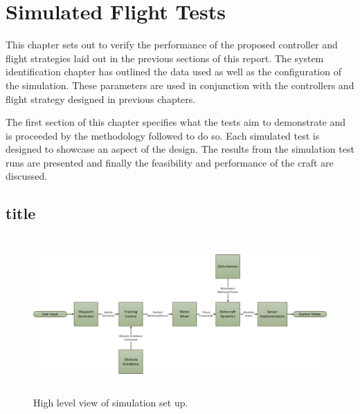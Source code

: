 \chapter{Simulated Flight Tests}
This chapter sets out to verify the performance of the proposed controller and flight strategies laid out in the previous sections of this report. The system identification chapter has outlined the data used as well as the configuration of the simulation. These parameters are used in conjunction with the controllers and flight strategy designed in previous chapters. 

The first section of this chapter specifies what the tests aim to demonstrate and is proceeded by the methodology followed to do so. Each simulated test is designed to showcase an aspect of the design. The results from the simulation test runs are presented and finally the feasibility and performance of the craft are discussed.
	
	\section{title}
	\begin{figure}[H]
		\centering
		\includegraphics[height = 6cm]{../References/Diagrams/Simulation.jpg} 
		\caption{High level view of simulation set up.}
		\label{IM_Sim}
		\end{figure}
		
